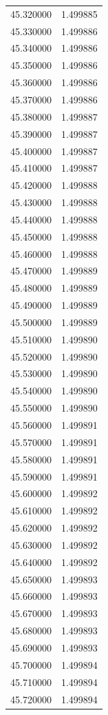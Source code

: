 \begin{tabular}{rr}
45.320000 & 1.499885 \\
45.330000 & 1.499886 \\
45.340000 & 1.499886 \\
45.350000 & 1.499886 \\
45.360000 & 1.499886 \\
45.370000 & 1.499886 \\
45.380000 & 1.499887 \\
45.390000 & 1.499887 \\
45.400000 & 1.499887 \\
45.410000 & 1.499887 \\
45.420000 & 1.499888 \\
45.430000 & 1.499888 \\
45.440000 & 1.499888 \\
45.450000 & 1.499888 \\
45.460000 & 1.499888 \\
45.470000 & 1.499889 \\
45.480000 & 1.499889 \\
45.490000 & 1.499889 \\
45.500000 & 1.499889 \\
45.510000 & 1.499890 \\
45.520000 & 1.499890 \\
45.530000 & 1.499890 \\
45.540000 & 1.499890 \\
45.550000 & 1.499890 \\
45.560000 & 1.499891 \\
45.570000 & 1.499891 \\
45.580000 & 1.499891 \\
45.590000 & 1.499891 \\
45.600000 & 1.499892 \\
45.610000 & 1.499892 \\
45.620000 & 1.499892 \\
45.630000 & 1.499892 \\
45.640000 & 1.499892 \\
45.650000 & 1.499893 \\
45.660000 & 1.499893 \\
45.670000 & 1.499893 \\
45.680000 & 1.499893 \\
45.690000 & 1.499893 \\
45.700000 & 1.499894 \\
45.710000 & 1.499894 \\
45.720000 & 1.499894 \\

\end{tabular}
